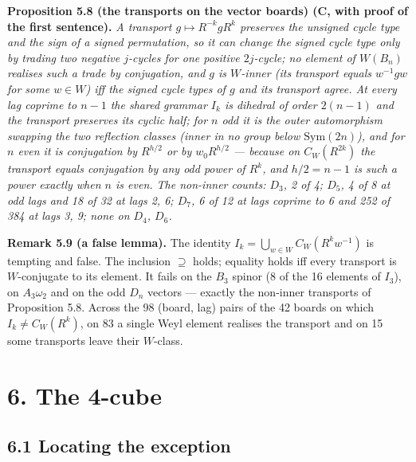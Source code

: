 \documentclass[
]{article}
\newcounter{none} %
\begin{document}
\textbf{Proposition 5.8 (the transports on the vector boards) (C, with
proof of the first sentence).} \emph{A transport
\(g \mapsto R^{-k}gR^k\) preserves the unsigned cycle type and the sign
of a signed permutation, so it can change the signed cycle type only by
trading two negative \(j\)-cycles for one positive \(2j\)-cycle; no
element of \(W(B_n)\) realises such a trade by conjugation, and \(g\) is
\(W\)-inner (its transport equals \(w^{-1}gw\) for some \(w \in W\)) iff
the signed cycle types of \(g\) and its transport agree. At every lag
coprime to \(n-1\) the shared grammar \(I_k\) is dihedral of order
\(2(n-1)\) and the transport preserves its cyclic half; for \(n\) odd it
is the outer automorphism swapping the two reflection classes (inner in
no group below \(\mathrm{Sym}(2n)\)), and for \(n\) even it is
conjugation by \(R^{h/2}\) or by \(w_0R^{h/2}\) --- because on
\(C_W(R^{2k})\) the transport equals conjugation by any odd power of
\(R^k\), and \(h/2 = n-1\) is such a power exactly when \(n\) is even.
The non-inner counts: \(D_3\), 2 of 4; \(D_5\), 4 of 8 at odd lags and
18 of 32 at lags 2, 6; \(D_7\), 6 of 12 at lags coprime to 6 and 252 of
384 at lags 3, 9; none on \(D_4\), \(D_6\).}

\textbf{Remark 5.9 (a false lemma).} The identity
\(I_k = \bigcup_{w \in W} C_W(R^kw^{-1})\) is tempting and false. The
inclusion \(\supseteq\) holds; equality holds iff every transport is
\(W\)-conjugate to its element. It fails on the \(B_3\) spinor (8 of the
16 elements of \(I_3\)), on \(A_3\omega_2\) and on the odd \(D_n\)
vectors --- exactly the non-inner transports of Proposition 5.8. Across
the 98 (board, lag) pairs of the 42 boards on which
\(I_k \ne C_W(R^k)\), on 83 a single Weyl element realises the transport
and on 15 some transports leave their \(W\)-class.

\section{6. The 4-cube}\label{the-4-cube}

\subsection{6.1 Locating the exception}\label{locating-the-exception}
\end{document}
